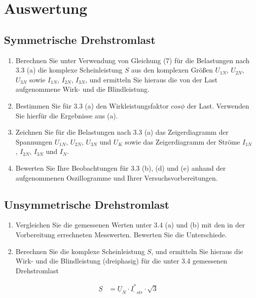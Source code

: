 \section{Auswertung}

\subsection{Symmetrische Drehstromlast }
\begin{enumerate}[label=\alph*)]
	\item Berechnen Sie unter Verwendung von Gleichung (7) für die Belastungen nach 3.3 (a) die komplexe Scheinleistung $S$ aus den komplexen Größen $U_{1N}$, $U_{2N}$, $U_{3N}$ sowie $I_{1N}$, $I_{2N}$, $I_{3N}$, und ermitteln Sie hieraus die von der Last aufgenommene Wirk- und die Blindleistung.
		
	\item Bestimmen Sie für 3.3 (a) den Wirkleistungsfaktor $cos\phi$ der Last. Verwenden Sie hierfür die Ergebnisse aus (a). 
	
	\item Zeichnen Sie für die Belastungen nach 3.3 (a) das Zeigerdiagramm der Spannungen $U_{1N}$, $U_{2N}$, $U_{3N}$ und $U_{K}$ sowie das Zeigerdiagramm der Ströme $I_{1N}$, $I_{2N}$, $I_{3N}$ und $I_{N}$.
	
	\item Bewerten Sie Ihre Beobachtungen für 3.3 (b), (d) und (e) anhand der aufgenommenen Oszillogramme und Ihrer Versuchsvorbereitungen. 
\end{enumerate}

\subsection{Unsymmetrische Drehstromlast }
\begin{enumerate}[label=\alph*)]
	\item Vergleichen Sie die gemessenen Werten unter 3.4 (a) und (b) mit den in der Vorbereitung errechneten Messwerten. Bewerten Sie die Unterschiede.
	
	\item Berechnen Sie die komplexe Scheinleistung $S$, und ermitteln Sie hieraus die Wirk- und die Blindleistung (dreiphasig) für die unter 3.4 gemessenen Drehstromlast
\end{enumerate}

\begin{align*}
	\underline{S} &= \underline{U}_{N}\cdot \underline{I^*}_{str}\cdot \sqrt{3}
\end{align*}
